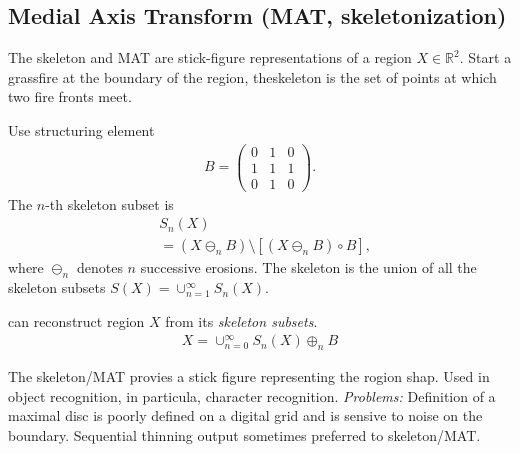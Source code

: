 \subsection{Medial Axis Transform (MAT, skeletonization)}
	 The skeleton and MAT are stick-figure representations of a region $X\in\mathbb{R}^2$. Start a grassfire at the boundary of the region, theskeleton is the set of points at which two fire fronts meet.
\begin{compactdesc}
	\item[\lp{Skeleton}] Use structuring element
		\begin{gather*}
			B=\left( 
				\begin{smallmatrix}
					0&1&0\\
					1&1&1\\
					0&1&0
				\end{smallmatrix}\right).
		\end{gather*} The $n$-th skeleton subset is 
		\begin{align*}
			&S_n(X)\\
			&=(X\ominus_nB)\setminus \left[ (X\ominus_n B)\circ B \right],
		\end{align*} 
		where $\ominus_n$ denotes $n$ successive erosions. The skeleton is the union of all the skeleton subsets $S(X)=\cup_{n=1}^{\infty}S_n(X)$.
	\item[\lp{Reconstruction}] can reconstruct region $X$ from its \emph{skeleton subsets}.
		\begin{gather*}
			X=\cup_{n=0}^{\infty}S_n(X)\oplus_n B
		\end{gather*}
	\item[\lp{Applications and problems}] The skeleton/MAT provies a stick figure representing the rogion shap. Used in object recognition, in particula, character recognition. \emph{Problems:} Definition of a maximal disc is poorly defined on a digital grid and is sensive to noise on the boundary. Sequential thinning output sometimes preferred to skeleton/MAT.
\end{compactdesc}
